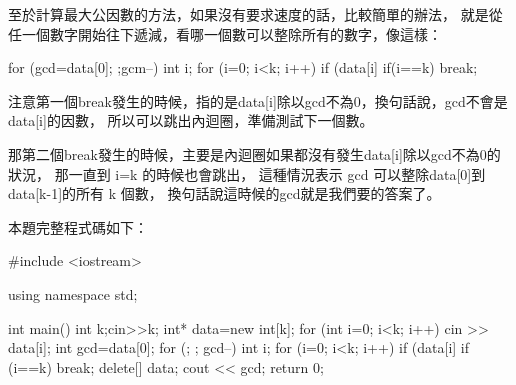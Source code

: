 至於計算最大公因數的方法，如果沒有要求速度的話，比較簡單的辦法，
就是從任一個數字開始往下遞減，看哪一個數可以整除所有的數字，像這樣：
\begin{inside}
	for (gcd=data[0]; ;gcm--) {
		int i;
		for (i=0; i<k; i++) {
			if (data[i]%
		}
		if(i==k) break;
	}
\end{inside}
注意第一個break發生的時候，指的是data[i]除以gcd不為0，換句話說，gcd不會是data[i]的因數，
所以可以跳出內迴圈，準備測試下一個數。

那第二個break發生的時候，主要是內迴圈如果都沒有發生data[i]除以gcd不為0的狀況，
那一直到 i=k 的時候也會跳出，
這種情況表示 gcd 可以整除data[0]到data[k-1]的所有 k 個數，
換句話說這時候的gcd就是我們要的答案了。

本題完整程式碼如下：	
\begin{cppcode}
#include <iostream>

using namespace std;

int main()
{
	int k;cin>>k;
	int* data=new int[k];
	for (int i=0; i<k; i++) cin >> data[i];
	int gcd=data[0];
	for (; ; gcd--) {
		int i;
		for (i=0; i<k; i++) {
			if (data[i]%
		}
		if (i==k) break;
	}
	delete[] data;
	cout << gcd;
	return 0;
}
\end{cppcode}

